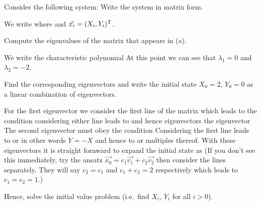 
Consider the following system: 
\subquestion Write the system in matrix form.

\solution
We write
where 
and $\vec{x_i}=(X_i,Y_i)^{\rm T}$. 

\subquestion
Compute the eigenvalues of the matrix that appears in (a).

\solution
We write the characteristic polynomial 
At this point we can see that $\lambda_1=0$ and $\lambda_2=-2$. 

\subquestion 
Find the corresponding eigenvectors and write the initial state $X_0=2$, $Y_0=0$ as a linear combination of eigenvectors. 

\solution
For the first eigenvector we consider the first line of the matrix which leads 
to the condition 
considering either line leads to 
and hence eigenvectors the eigenvector
The second eigenvector must obey the condition
Considering the first line leads to 
or in other words $Y=-X$ and hence to
or multiples thereof. With these eigenvectors it is straight fornward to expand the initial state as
(If you don't see this immediately, try the ansatz $\vec{x_0}=c_1 \vec{v_1}+c_2 \vec{v_2}$ then consider the lines separately. They will say $c_2=c_1$ and $c_1+c_2=2$ respectively which leads to $c_1=c_2=1$.)

\subquestion
Hence, solve the initial value problem (i.e.~find $X_i$, $Y_i$ for all $i>0$).

